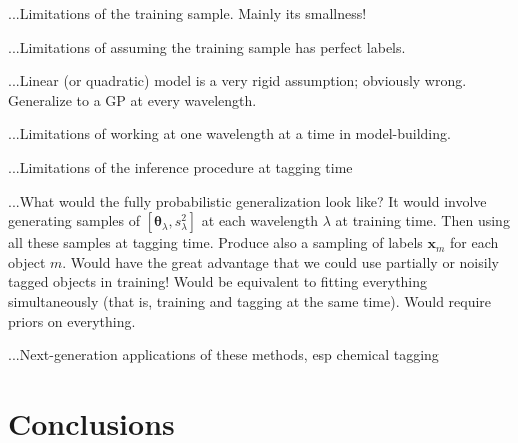 \documentclass[12pt, preprint]{aastex}
\newcommand{\set}[1]{\bm{#1}}
\begin{document}
...Limitations of the training sample.  Mainly its smallness!

...Limitations of assuming the training sample has perfect labels.

...Linear (or quadratic) model is a very rigid assumption; obviously wrong.
Generalize to a GP at every wavelength.

...Limitations of working at one wavelength at a time in model-building.

...Limitations of the inference procedure at tagging time

...What would the fully probabilistic generalization look like?
It would involve generating samples of $[\set{\theta}_\lambda, s_\lambda^2]$ at each wavelength $\lambda$ at training time.
Then using all these samples at tagging time.
Produce also a sampling of labels $\set{x}_m$ for each object $m$.
Would have the great advantage that we could use partially or noisily tagged objects in training!
Would be equivalent to fitting everything simultaneously (that is, training and tagging at the same time).
Would require priors on everything.

...Next-generation applications of these methods, esp chemical tagging

\section{Conclusions}
\end{document}
